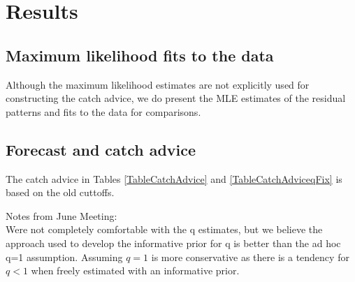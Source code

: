 \section{Results}

\subsection{Maximum likelihood fits to the data}
Although  the maximum likelihood estimates are not explicitly used for constructing the catch advice, we do present the MLE estimates of the residual patterns and fits to the data for comparisons.

\subsection{Forecast and catch advice}
 The catch advice in Tables \ref{TableCatchAdvice} and \ref{TableCatchAdviceqFix} is based on the old cuttoffs.








Notes from June Meeting:\\
Were not completely comfortable with the q estimates, but we believe the approach used to develop the informative prior for q is better than the ad hoc q=1 assumption.  Assuming $q=1$ is more conservative as there is a tendency for $q<1$ when freely estimated with an informative prior.
